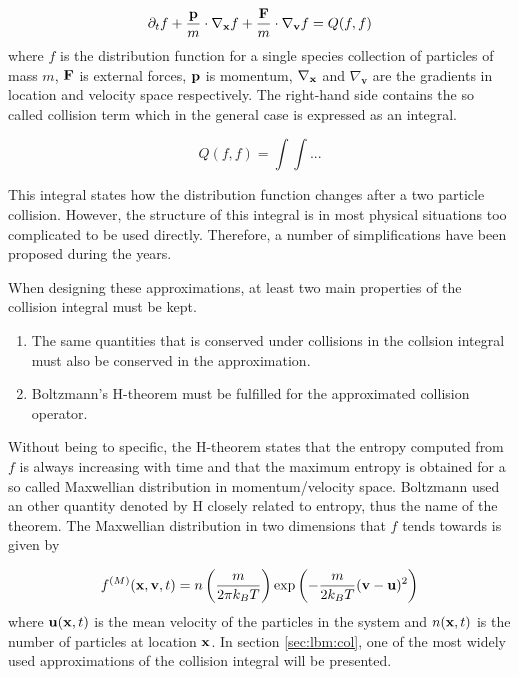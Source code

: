 \begin{equation}\label{eq:lbm:boltzmann-eq}
\partial_t f + \frac{\mathbf{p}}{m} \cdot \nabla_{\mathbf{x}}f + \frac{\mathbf{F}}{m} \cdot
\nabla_{\mathbf{v}}f = Q(f, f)
\end{equation}
where $f$ is the distribution function for a single species collection
of particles of mass $m$, $\mathbf{F}$ is external forces, $\mathbf{p}$ is momentum,
$\nabla_{\mathbf{x}}$ and $\nabla_{\mathbf{v}}$ are the gradients in location and
velocity space respectively. The right-hand side contains the so
called collision term which in the general case is expressed as an
integral. 

\begin{equation}
Q(f, f) = \int \int ...
\end{equation}

This integral states how the distribution function changes after a two
particle collision. However, the structure of this integral is in most
physical situations too complicated to be used directly. Therefore, a
number of simplifications have been proposed during the years.

When designing these approximations, at least two main properties of
the collision integral must be kept. \cite{wolf-gladrow}

\begin{enumerate}
  \item The same quantities that is conserved under collisions in the
    collsion integral must also be conserved in the approximation.
  \item Boltzmann's H-theorem must be fulfilled for the
    approximated collision operator.
\end{enumerate}

Without being to specific, the H-theorem states that the entropy
computed from $f$ is always increasing with time and that the maximum
entropy is obtained for a so called Maxwellian distribution in
momentum/velocity space. Boltzmann used an other quantity denoted by H
closely related to entropy, thus the name of the theorem. The
Maxwellian distribution in two dimensions that $f$ tends towards is
given by

\begin{equation}\label{eq:lbm:maxwell}
f^{(M)}(\mathbf{x}, \mathbf{v}, t) = n \left ( \frac{m}{2 \pi k_B T} \right )
\exp{\left( -\frac{m}{2 k_B T} (\mathbf{v} - \ensuremath{\mathbf{u}})^2\right)}
\end{equation} 
where $\mathbf{u}(\mathbf{x}, t)$ is the mean velocity of the particles in the system and
$n(\mathbf{x}, t)$ is the number of particles at location $\mathbf{x}$. In section
\ref{sec:lbm:col}, one of the most widely used approximations of the
collision integral will be presented.
